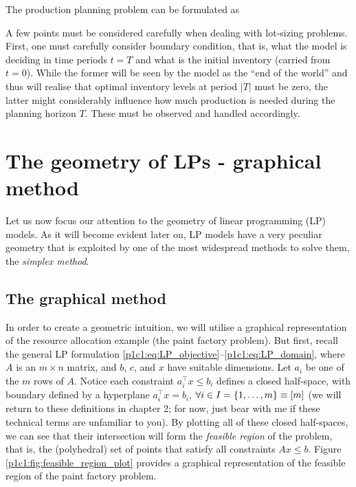 The production planning problem can be formulated as
%
%

A few points must be considered carefully when dealing with lot-sizing problems. First, one must carefully consider boundary condition, that is, what the model is deciding in time periods $t = T$ and what is the initial inventory (carried from $t=0$). While the former will be seen by the model as the ``end of the world'' and thus will realise that optimal inventory levels at period $|T|$ must be zero, the latter might considerably influence how much production is needed during the planning horizon $T$. These must be observed and handled accordingly. 
 


\section{The geometry of LPs - graphical method} 

Let us now focus our attention to the geometry of linear programming (LP) models. As it will become evident later on, LP models have a very peculiar geometry that is exploited by one of the most widespread methods to solve them, the \emph{simplex method}. 

\subsection{The graphical method}

In order to create a geometric intuition, we will utilise a graphical representation of the resource allocation example (the paint factory problem). But first, recall the general LP formulation \eqref{p1c1:eq:LP_objective}--\eqref{p1c1:eq:LP_domain}, where $A$ is an $m \times n$ matrix, and $b$, $c$, and $x$ have suitable dimensions. Let $a_i$ be one of the $m$ rows of $A$. Notice each constraint $a_i^\top x \leq b_i$ defines a closed half-space, with boundary defined by a hyperplane $a_i^\top x= b_i$, $\forall i \in I = \left\{ 1,\dots,m \right \} \equiv [m]$ (we will return to these definitions in chapter 2; for now, just bear with me if these technical terms are unfamiliar to you). By plotting all of these closed half-spaces, we can see that their intersection will form the \emph{feasible region} of the problem, that is, the (polyhedral) set of points that satisfy all constraints $Ax \le b$. Figure \ref{p1c1:fig:feasible_region_plot} provides a graphical representation of the feasible region of the paint factory problem. 

